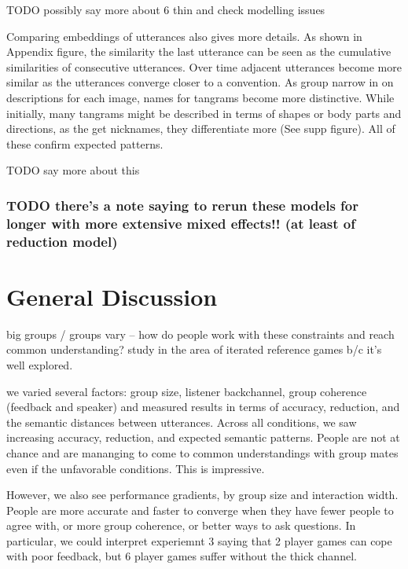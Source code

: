 \documentclass[
  english,
  a4paper,
]{article}
\begin{document}
TODO possibly say more about 6 thin and check modelling issues

Comparing embeddings of utterances also gives more details. As shown in Appendix figure, the similarity the last utterance can be seen as the cumulative similarities of consecutive utterances. Over time adjacent utterances become more similar as the utterances converge closer to a convention. As group narrow in on descriptions for each image, names for tangrams become more distinctive. While initially, many tangrams might be described in terms of shapes or body parts and directions, as the get nicknames, they differentiate more (See supp figure). All of these confirm expected patterns.

TODO say more about this

\hypertarget{todo-theres-a-note-saying-to-rerun-these-models-for-longer-with-more-extensive-mixed-effects-at-least-of-reduction-model}{%
\subsubsection{TODO there's a note saying to rerun these models for longer with more extensive mixed effects!! (at least of reduction model)}\label{todo-theres-a-note-saying-to-rerun-these-models-for-longer-with-more-extensive-mixed-effects-at-least-of-reduction-model}}

\hypertarget{general-discussion}{%
\section{General Discussion}\label{general-discussion}}

big groups / groups vary -- how do people work with these constraints and reach common understanding? study in the area of iterated reference games b/c it's well explored.

we varied several factors: group size, listener backchannel, group coherence (feedback and speaker) and measured results in terms of accuracy, reduction, and the semantic distances between utterances. Across all conditions, we saw increasing accuracy, reduction, and expected semantic patterns. People are not at chance and are mananging to come to common understandings with group mates even if the unfavorable conditions. This is impressive.

However, we also see performance gradients, by group size and interaction width. People are more accurate and faster to converge when they have fewer people to agree with, or more group coherence, or better ways to ask questions. In particular, we could interpret experiemnt 3 saying that 2 player games can cope with poor feedback, but 6 player games suffer without the thick channel.
\end{document}
